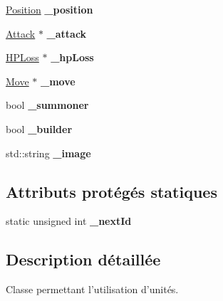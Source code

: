\begin{DoxyCompactItemize}
\item 
\hypertarget{classUnit_a6b77105078af83db82bfd4006a154e74}{\hyperlink{classPosition}{Position} {\bfseries \+\_\+position}}\label{classUnit_a6b77105078af83db82bfd4006a154e74}

\item 
\hypertarget{classUnit_ad6e87d9c5ea0823038a73cd725fc9b9c}{\hyperlink{classAttack}{Attack} $\ast$ {\bfseries \+\_\+attack}}\label{classUnit_ad6e87d9c5ea0823038a73cd725fc9b9c}

\item 
\hypertarget{classUnit_a1c139b04cef906782f4a96e520d9a898}{\hyperlink{classHPLoss}{H\+P\+Loss} $\ast$ {\bfseries \+\_\+hp\+Loss}}\label{classUnit_a1c139b04cef906782f4a96e520d9a898}

\item 
\hypertarget{classUnit_ad706684b8e916ef6a4df0c627a530afd}{\hyperlink{classMove}{Move} $\ast$ {\bfseries \+\_\+move}}\label{classUnit_ad706684b8e916ef6a4df0c627a530afd}

\item 
\hypertarget{classUnit_ab0e6ee2082c96facf7b6e297bb032e18}{bool {\bfseries \+\_\+summoner}}\label{classUnit_ab0e6ee2082c96facf7b6e297bb032e18}

\item 
\hypertarget{classUnit_a18e0ba8d6b5a45db49111dc5140cc634}{bool {\bfseries \+\_\+builder}}\label{classUnit_a18e0ba8d6b5a45db49111dc5140cc634}

\item 
\hypertarget{classUnit_a6760f1e268d6abe3413b5fd91d3c3c0f}{std\+::string {\bfseries \+\_\+image}}\label{classUnit_a6760f1e268d6abe3413b5fd91d3c3c0f}

\end{DoxyCompactItemize}
\subsection*{Attributs protégés statiques}
\begin{DoxyCompactItemize}
\item 
\hypertarget{classUnit_aff329e42743a57d23cd317dbbae9e4db}{static unsigned int {\bfseries \+\_\+next\+Id}}\label{classUnit_aff329e42743a57d23cd317dbbae9e4db}

\end{DoxyCompactItemize}


\subsection{Description détaillée}
Classe permettant l'utilisation d'unités. 

